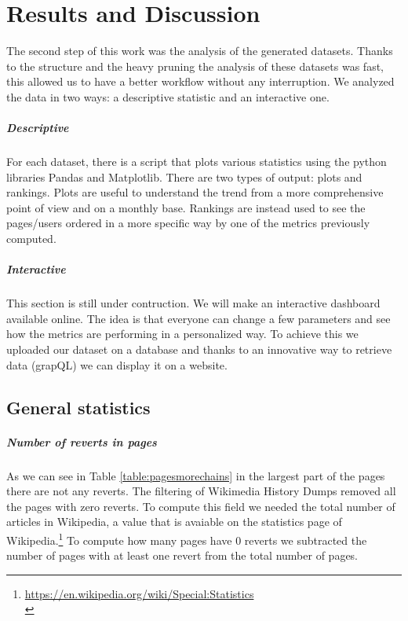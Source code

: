 \chapter{Results and Discussion}

The second step of this work was the analysis of the generated datasets. Thanks to the structure
and the heavy pruning the analysis of these datasets was fast, this allowed us to have a better workflow
without any interruption. We analyzed the data in two ways: a descriptive statistic and an interactive
one.
\paragraph*{Descriptive}
For each dataset, there is a script that plots various statistics using the python libraries
Pandas and Matplotlib. There are two types of output: plots and rankings. 
Plots are useful to understand the trend from a more comprehensive point of view and on a monthly base.  
Rankings are instead used to see the pages/users ordered in a more specific way by one of the
metrics previously computed. 
\paragraph*{Interactive}
This section is still under contruction. We will make an interactive dashboard available online. The idea is
that everyone can change a few parameters and see how the metrics are performing in a personalized
way. To achieve this we uploaded our dataset on a database and thanks to an innovative way to retrieve
data (grapQL) we can display it on a website. 


\section{General statistics}
\paragraph*{Number of reverts in pages}
As we can see in Table \ref{table:pagesmorechains} in the largest part of the pages there are not
any reverts. The filtering of Wikimedia History Dumps removed all the pages with zero reverts. To
compute this field we needed the total number of articles in Wikipedia, a value that is avaiable on
the statistics page of Wikipedia.\footnote{\url{https://en.wikipedia.org/wiki/Special:Statistics}\\
                                            } 
To compute how many pages have 0 reverts we
subtracted the number of pages with at least one revert from the total number of pages.

